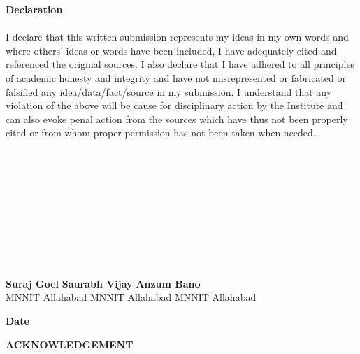 \documentclass[11pt]{report}
\begin{document}
	
	\begin{center}
		\Huge
		\textbf{Declaration} \\
		\ \\
		\Large
		I declare that this written submission represents my ideas in my own words and where
		others’ ideas or words have been included, I have adequately cited and referenced the
		original sources. I also declare that I have adhered to all principles of academic
		honesty and integrity and have not misrepresented or fabricated or falsified any
		idea/data/fact/source in my submission. I understand that any violation of the above
		will be cause for disciplinary action by the Institute and can also evoke penal action
		from the sources which have thus not been properly cited or from whom proper
		permission has not been taken when needed.\\
		\ \\
		\ \\
		\ \\
		\ \\
		\ \\
		\ \\
		\ \\ 
		\ \\
		\ \\
		\ \\
		\textbf{Suraj Goel}
		\hfill
		\textbf{ Saurabh Vijay} 
		\hfill
		\textbf{Anzum Bano}\\
		MNNIT Allahabad
		\hfill
		MNNIT Allahabad
		\hfill
		MNNIT Allahabad
		
		\begin{flushleft}
			\vspace{2.5cm}
			\textbf{Date}\\
		\end{flushleft}
	\end{center}
	
	
	
	\pagebreak
	
	\begin{center}
		\huge
		
		\textbf{ACKNOWLEDGEMENT}
	\end{center}
	\vspace{3cm}
	
\end{document}
